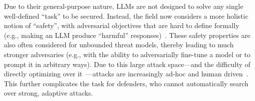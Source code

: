 Due to their general-purpose nature, LLMs are not designed to solve any single well-defined ``task'' to be secured. Instead, the field now considers a more holistic notion of ``safety'', with adversarial objectives that are hard to define formally (e.g., making an LLM produce ``harmful'' responses)~\citep{christiano2017deep,ouyang2022training,bai2022training,casper2023open}. These safety properties are also often considered for unbounded threat models, thereby leading to much stronger adversaries (e.g., with the ability to adversarially fine-tune a model or to prompt it in arbitrary ways). 
Due to this large attack space---and the difficulty of directly optimizing over it~\citep{carlini2024aligned}---attacks are increasingly ad-hoc and human driven~\citep{li2024llm}. This further complicates the task for defenders, who cannot automatically search over strong, adaptive attacks. 

